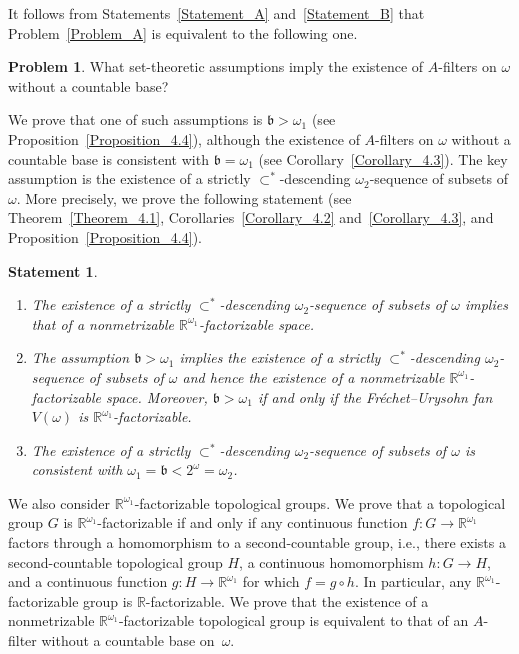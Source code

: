 \documentclass[a4paper,12pt]{amsart}
\newtheorem{statementA}{Statement}
\theoremstyle{definition}
\newtheorem{problemA}{Problem}
\theoremstyle{remark}
\begin{document}
It follows from Statements~\ref{Statement_A} and~\ref{Statement_B} that Problem~\ref{Problem_A} 
is equivalent to the following one.

\begin{problemA}
What set-theoretic assumptions imply the existence of $A$-filters on $\omega$ without a countable base? 
\end{problemA}

We prove that one of such assumptions is $\mathfrak b>\omega_1$ (see Proposition~\ref{Proposition_4.4}), although the 
existence of $A$-filters on $\omega$ without a countable base is consistent with $\mathfrak b=\omega_1$ (see 
Corollary~\ref{Corollary_4.3}). The key assumption is the existence of a strictly $\subset^*$-descending 
$\omega_2$-sequence of subsets of $\omega$. More precisely, we prove the following 
statement  (see Theorem~\ref{Theorem_4.1}, Corollaries~\ref{Corollary_4.2} and~\ref{Corollary_4.3}, 
and Proposition~\ref{Proposition_4.4}). 

\begin{statementA}
\begin{enumerate}
\item[{\rm(1)}]
The existence of a strictly $\subset^*$-descending 
$\omega_2$-sequence of subsets of $\omega$ implies that of a nonmetrizable $\mathbb R^{\omega_1}$-factorizable 
space. 
\item[{\rm(2)}] 
The assumption $\mathfrak b>\omega_1$ implies the existence of a strictly $\subset^*$-descending 
$\omega_2$-sequence of subsets of $\omega$ and hence the existence of a nonmetrizable $\mathbb 
R^{\omega_1}$-factorizable space. Moreover, $\mathfrak b>\omega_1$ if and only if the Fr\'echet--Urysohn 
fan $V(\omega)$ is $\mathbb R^{\omega_1}$-factorizable. 
\item[{\rm(3)}] 
The existence of a strictly $\subset^*$-descending 
$\omega_2$-sequence of subsets of $\omega$ is consistent with $\omega_1=\mathfrak b<2^\omega=\omega_2$. 
\end{enumerate}
\end{statementA}

We also consider $\mathbb R^{\omega_1}$-factorizable topological groups. We prove that a topological group $G$ is 
$\mathbb R^{\omega_1}$-factorizable if and only if any continuous function $f\colon G\to \mathbb R^{\omega_1}$ 
factors through a homomorphism to a second-countable group, i.e., there exists a second-countable 
topological group $H$, a continuous homomorphism $h\colon G \to H$, and a continuous function $g\colon H\to 
\mathbb R^{\omega_1}$ for which $f = g \circ h$. In particular, any $\mathbb R^{\omega_1}$-factorizable group is 
$\mathbb R$-factorizable. We prove that the existence of a nonmetrizable $\mathbb R^{\omega_1}$-factorizable 
topological group is equivalent to that of an $A$-filter without a countable base on~$\omega$. 
\end{document}
